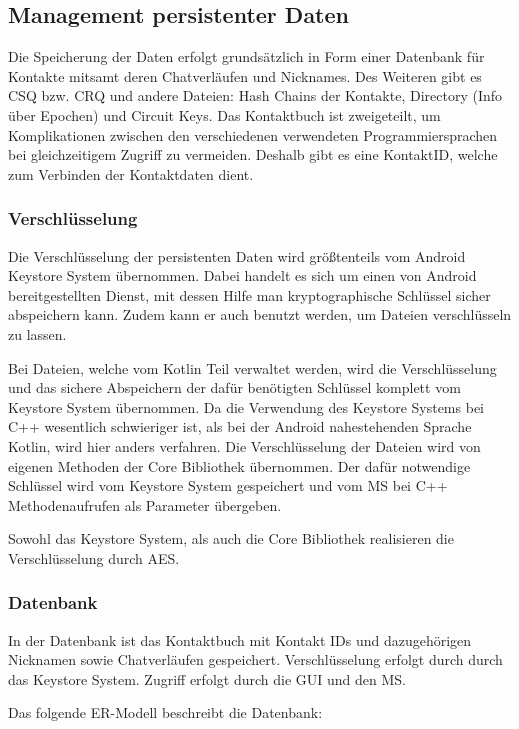 \subsection{Management persistenter Daten}

Die Speicherung der Daten erfolgt grundsätzlich in Form einer Datenbank für Kontakte mitsamt deren Chatverläufen und Nicknames. Des Weiteren gibt es \ac{CSQ} bzw. \ac{CRQ} und andere Dateien: Hash Chains der Kontakte, Directory (Info über Epochen) und Circuit Keys.
Das Kontaktbuch ist zweigeteilt, um Komplikationen zwischen den verschiedenen verwendeten Programmiersprachen bei gleichzeitigem Zugriff zu vermeiden. Deshalb gibt es eine KontaktID, welche zum Verbinden der Kontaktdaten dient.


\subsubsection{Verschlüsselung}
Die Verschlüsselung der persistenten Daten wird größtenteils vom Android Keystore System übernommen.
Dabei handelt es sich um einen von Android bereitgestellten Dienst, mit dessen Hilfe man kryptographische Schlüssel sicher abspeichern kann.
Zudem kann er auch benutzt werden, um Dateien verschlüsseln zu lassen.

Bei Dateien, welche vom Kotlin Teil verwaltet werden, wird die Verschlüsselung und das sichere Abspeichern der dafür benötigten Schlüssel komplett vom Keystore System übernommen.
Da die Verwendung des Keystore Systems bei C++ wesentlich schwieriger ist, als bei der Android nahestehenden Sprache Kotlin, wird hier anders verfahren.
Die Verschlüsselung der Dateien wird von eigenen Methoden der Core Bibliothek übernommen.
Der dafür notwendige Schlüssel wird vom Keystore System gespeichert und vom \ac{MS} bei C++ Methodenaufrufen als Parameter übergeben.

Sowohl das Keystore System, als auch die Core Bibliothek realisieren die Verschlüsselung durch AES.

\newpage
\subsubsection{Datenbank}
In der Datenbank ist das Kontaktbuch mit Kontakt IDs und dazugehörigen Nicknamen sowie Chatverläufen gespeichert.
Verschlüsselung erfolgt durch durch das Keystore System.
Zugriff erfolgt durch die \ac{GUI} und den \ac{MS}.

Das folgende ER-Modell beschreibt die Datenbank:

